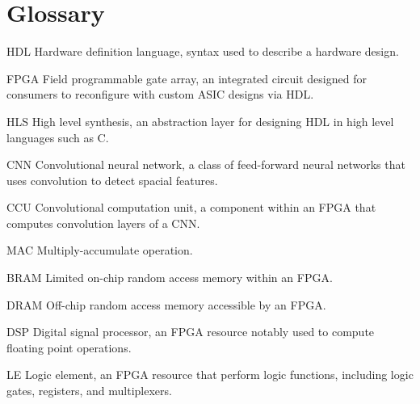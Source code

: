 \chapter*{Glossary}      %
\thispagestyle{plain}
%
\begin{glossary}
\item[HDL] Hardware definition language, syntax used to describe a hardware design.
\item[FPGA] Field programmable gate array, an integrated circuit designed for consumers to reconfigure with custom ASIC designs via HDL.
\item[HLS] High level synthesis, an abstraction layer for designing HDL in high level languages such as C.
\item[CNN] Convolutional neural network, a class of feed-forward neural networks that uses convolution to detect spacial features.
\item[CCU] Convolutional computation unit, a component within an FPGA that computes convolution layers of a CNN.
\item[MAC] Multiply-accumulate operation.
\item[BRAM] Limited on-chip random access memory within an FPGA.
\item[DRAM] Off-chip random access memory accessible by an FPGA.
\item[DSP] Digital signal processor, an FPGA resource notably used to compute floating point operations.
\item[LE] Logic element, an FPGA resource that perform logic functions, including logic gates, registers, and multiplexers.
 
\end{glossary}